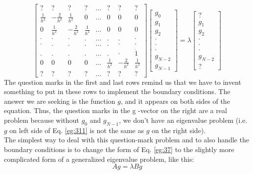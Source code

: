 \documentclass{book}
\theoremstyle{plain}
\theoremstyle{definition}
\numberwithin{exm}{chapter}
\theoremstyle{remark}
\theoremstyle{summary}
\theoremstyle{overview}
\begin{document}
				\begin{equation}\label{eq:311}
\left[\begin{array}{cccccccc}
? & ? & ? & ? & \ldots & ? & ? & ? \\
\frac{1}{h^{2}} & -\frac{2}{h^{2}} & \frac{1}{h^{2}} & 0 & \ldots & 0 & 0 & 0 \\
0 & \frac{1}{h^{2}} & -\frac{2}{h^{2}} & \frac{1}{h^{2}} & \ldots & 0 & 0 & 0 \\
\cdot & \cdot & \cdot & . & \ldots & . & . & \cdot \\
\cdot & . & . & . & \ldots & . & \cdot & \cdot \\
. & . & . & . & \ldots & . & \cdot & \dot{1} \\
0 & 0 & 0 & 0 & \ldots & \frac{1}{h^{2}} & -\frac{2}{h^{2}} & \frac{1}{h^{2}} \\
? & ? & ? & ? & \ldots & ? & ? & ?
\end{array}\right]\left[\begin{array}{r}
g_{0} \\
g_{1} \\
g_{2} \\
\cdot \\
\cdot \\
\cdot \\
g_{N-2} \\
g_{N-1}
\end{array}\right]=\lambda\left[\begin{array}{r}
? \\
g_{1} \\
g_{2} \\
\cdot \\
\cdot \\
\cdot \\
g_{N-2} \\
?
\end{array}\right]
\end{equation}
The question marks in the first and last rows remind us that we have to invent
something to put in these rows to implement the boundary conditions. The
answer we are seeking is the function $g$, and it appears on both sides of the
equation. Thus, the question marks in the
g -vector on the right are a real problem
because without
$g_0$ and
$g_{N-1}$, we don\rq t have an eigenvalue problem (i.e.
$g$ on left
side of Eq. \eqref{eg:311} is not the same as
$g$ on the right side). \\ 
The simplest way to deal with this question-mark problem and to also handle
the boundary conditions is to change the form of Eq. \eqref{eg:37} to the slightly more
complicated form of a generalized eigenvalue problem, like this:
\begin{equation}\label{eq:312}
		Ag = \lambda Bg
				\end{equation}
\end{document}

